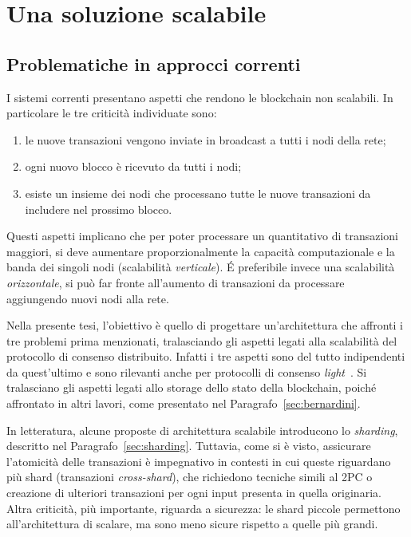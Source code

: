 \chapter{Una soluzione scalabile}

\section{Problematiche in approcci correnti}

I sistemi correnti presentano aspetti che rendono le blockchain non scalabili. In particolare le tre criticità individuate sono:

\begin{enumerate}
	\item le nuove transazioni vengono inviate in broadcast a tutti i nodi della rete;
	\item ogni nuovo blocco è ricevuto da tutti i nodi;
	\item esiste un insieme dei nodi che processano tutte le nuove transazioni da includere nel prossimo blocco.
\end{enumerate}

Questi aspetti implicano che per poter processare un quantitativo di transazioni maggiori, si deve aumentare proporzionalmente la capacità computazionale e la banda dei singoli nodi (scalabilità \emph{verticale}). \'E preferibile invece una scalabilità \emph{orizzontale}, si può far fronte all'aumento di transazioni da processare aggiungendo nuovi nodi alla rete.

Nella presente tesi, l'obiettivo è quello di progettare un'architettura che affronti i tre problemi prima menzionati, tralasciando gli aspetti legati alla scalabilità del protocollo di consenso distribuito. Infatti i tre aspetti sono del tutto indipendenti da quest'ultimo e sono rilevanti anche per protocolli di consenso \emph{light}~\cite{poon2016bitcoin}. Si tralasciano gli aspetti legati allo storage dello stato della blockchain, poiché affrontato in altri lavori, come presentato nel Paragrafo~\ref{sec:bernardini}.

In letteratura, alcune proposte di architettura scalabile introducono lo \emph{sharding}, descritto nel Paragrafo~\ref{sec:sharding}. Tuttavia, come si è visto, assicurare l'atomicità delle transazioni è impegnativo in contesti in cui queste riguardano più shard (transazioni \emph{cross-shard}), che richiedono tecniche simili al 2PC o creazione di ulteriori transazioni per ogni input presenta in quella originaria. Altra criticità, più importante, riguarda a sicurezza: le shard piccole permettono all'architettura di scalare, ma sono meno sicure rispetto a quelle più grandi.


